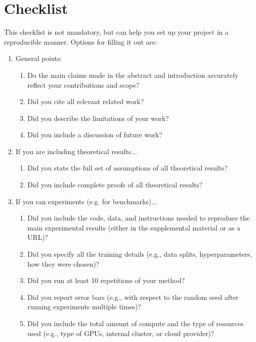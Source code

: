 \documentclass{article}
\begin{document}
\section*{Checklist}
This checklist is not mandatory, but can help you set up your project in a reproducible manner.
Options for filling it out are:
\answerYes{}
\answerNo{}
\answerNA{}
\begin{enumerate}

\item General points:
\begin{enumerate}
  \item Do the main claims made in the abstract and introduction accurately reflect your contributions and scope?
    \answerTODO{}
  \item Did you cite all relevant related work?
    \answerTODO{}
  \item Did you describe the limitations of your work?
    \answerTODO{}
  \item Did you include a discussion of future work?
    \answerTODO{}
\end{enumerate}

\item If you are including theoretical results...
\begin{enumerate}
  \item Did you state the full set of assumptions of all theoretical results?
    \answerTODO{}
	\item Did you include complete proofs of all theoretical results?
    \answerTODO{}
\end{enumerate}

\item If you ran experiments (e.g. for benchmarks)...
\begin{enumerate}
  \item Did you include the code, data, and instructions needed to reproduce the main experimental results (either in the supplemental material or as a URL)?
    \answerTODO{}
  \item Did you specify all the training details (e.g., data splits, hyperparameters, how they were chosen)?
    \answerTODO{}
  \item Did you run at least 10 repetitions of your method?
    \answerTODO{}
  \item Did you report error bars (e.g., with respect to the random seed after running experiments multiple times)?
    \answerTODO{}
  \item Did you include the total amount of compute and the type of resources used (e.g., type of GPUs, internal cluster, or cloud provider)?
    \answerTODO{}
\end{enumerate}


\end{enumerate}
\end{document}
